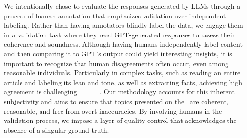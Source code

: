 We intentionally chose to evaluate the responses generated by LLMs through a process of human annotation that emphasizes validation over independent labeling. Rather than having annotators blindly label the data, we engage them in a validation task where they read GPT-generated responses to assess their coherence and soundness. Although having humans independently label content and then comparing it to GPT's output could yield interesting insights, it is important to recognize that human disagreements often occur, even among reasonable individuals. Particularly in complex tasks, such as reading an entire article and labeling its lean and tone, as well as extracting facts, achieving high agreement is challenging ____. Our methodology accounts for this inherent subjectivity and aims to ensure that topics presented on the \mbd\ are coherent, reasonable, and free from overt inaccuracies. By involving humans in the validation process, we impose a layer of quality control that acknowledges the absence of a singular ground truth. %